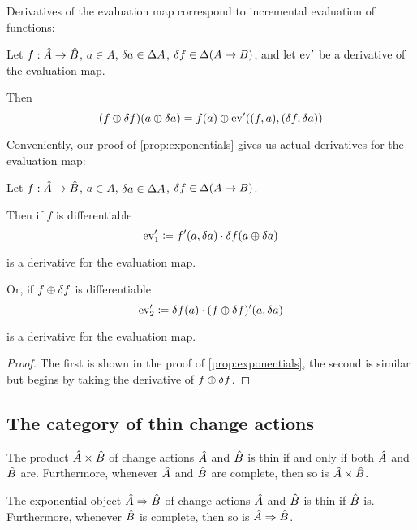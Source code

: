 Derivatives of the evaluation map correspond to incremental evaluation of functions:

\begin{prop}[Incrementalization]
\label{prop:incrementalization}
  Let $f: \hat{A} \rightarrow \hat{B}$, $a \in A$, $\delta a \in
  \Delta A$, $\delta f \in \Delta (A \rightarrow B)$, and let
  $\operatorname{ev}'$ be a derivative of the evaluation map.

  Then
  $$(f \oplus \delta f)(a \oplus \delta a) = f(a) \oplus \operatorname{ev}'((f, a), (\delta f, \delta a))$$
\end{prop}

Conveniently, our proof of \cref{prop:exponentials} gives us actual derivatives for the evaluation map:

\begin{prop}
\label{prop:evDerivatives}
  Let $f: \hat{A} \rightarrow \hat{B}$, $a \in A$, $\delta a \in
  \Delta A$, $\delta f \in \Delta (A \rightarrow B)$.

  Then if $f$ is differentiable
  $$\operatorname{ev}'_1 \coloneqq f'(a, \delta a) \cdot \delta f(a \oplus \delta a)$$

  is a derivative for the evaluation map.

  Or, if $f \oplus \delta f$ is differentiable
  $$\operatorname{ev}'_2 \coloneqq \delta f(a) \cdot (f \oplus \delta f)'(a, \delta a)$$

  is a derivative for the evaluation map.
\end{prop}
\ifproofs
\begin{proof}
  The first is shown in the proof of \cref{prop:exponentials}, the second is
  similar but begins by taking the derivative of $f \oplus \delta f$.
\end{proof}
\fi

\subsection{The category of thin change actions}

\begin{prop}
  The product $\hat{A} \times \hat{B}$ of change actions $\hat{A}$ and $\hat{B}$ is thin if and only if both $\hat{A}$ and $\hat{B}$ are.
  Furthermore, whenever $\hat{A}$ and $\hat{B}$ are complete, then so is $\hat{A} \times \hat{B}$.

  The exponential object $\hat{A} \Rightarrow \hat{B}$ of change actions $\hat{A}$ and $\hat{B}$ is thin if $\hat{B}$ is.
  Furthermore, whenever $\hat{B}$ is complete, then so is $\hat{A} \Rightarrow \hat{B}$.
\end{prop}

